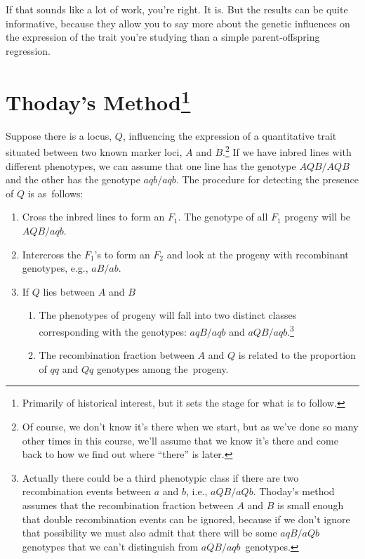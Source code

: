 \noindent If that sounds like a lot of work, you're right. It is. But
the results can be quite informative, because they allow you to say
more about the genetic influences on the expression of the trait
you're studying than a simple parent-offspring regression.

\section*{Thoday's Method\footnote{Primarily of historical
interest, but it sets the stage for what is to follow.}} 

Suppose there is a locus, $Q$, influencing the expression of a
quantitative trait situated between two known marker loci, $A$ and
$B$.\footnote{Of course, we don't know it's there when we start, but
  as we've done so many other times in this course, we'll assume that
  we know it's there and come back to how we find out where ``there''
  is later.} If we have inbred lines with different phenotypes, we can
assume that one line has the genotype $AQB/AQB$ and the other has the
genotype $aqb/aqb$. The procedure for detecting the presence of $Q$ is
as~follows:

\begin{enumerate}

\item Cross the inbred lines to form an $F_1$. The genotype of all
$F_1$ progeny will be~$AQB/aqb$.

\item Intercross the $F_1$'s to form an $F_2$ and look at the progeny 
with recombinant genotypes, e.g., $aB/ab$.

\item If $Q$ lies between $A$ and $B$

    \begin{enumerate}

    \item The phenotypes of progeny will fall into two distinct
      classes corresponding with the genotypes: $aqB/aqb$ and
      $aQB/aqb$.\footnote{Actually there could be a third phenotypic
        class if there are two recombination events between $a$ and
        $b$, i.e., $aQB/aQb$. Thoday's method assumes that the
        recombination fraction between $A$ and $B$ is small enough
        that double recombination events can be ignored, because if we
        don't ignore that possibility we must also admit that there
        will be some $aqB/aQb$ genotypes that we can't distinguish
        from $aQB/aqb$~genotypes.}

    \item The recombination fraction between $A$ and $Q$ is related to
    the proportion of $qq$ and $Qq$ genotypes among the~progeny.

    \end{enumerate}

\end{enumerate}

